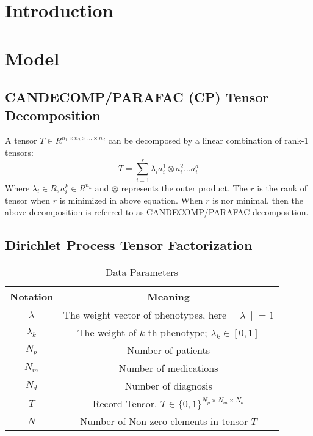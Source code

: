 \documentclass[conference]{IEEEtran}
\begin{document}
\section{Introduction}

\section{Model}

\subsection{CANDECOMP/PARAFAC (CP) Tensor Decomposition}

A tensor $T \in R^{n_1 \times n_2 \times \ldots \times n_d}$ can be decomposed by a linear combination of rank-$1$ tensors:
\[
	T = \sum_{i=1}^r \lambda_i a_i^1 \otimes a_i^2 \ldots a_i^d
\]
Where $\lambda_i \in R, a_i^k \in R^{n_k}$ and $\otimes$ represents the outer product. The $r$ is the rank of tensor when $r$ is minimized in above equation. When $r$ is nor minimal, then the above decomposition is referred to as CANDECOMP/PARAFAC decomposition. 

\subsection{Dirichlet Process Tensor Factorization}

\begin{table}[h]
\caption{Data Parameters}
\label{data_param}
\centering
\begin{tabular}{|c||c|}
\hline
Notation & Meaning\\
\hline
\textbf{$\lambda$} & The weight vector of phenotypes, here $\|\lambda\| = 1$\\
\hline
$\lambda_k$ & The weight of $k$-th phenotype; $\lambda_k \in [0, 1]$ \\
\hline
$N_p$ & Number of patients \\
\hline
$N_m$ & Number of medications \\
\hline
$N_d$ & Number of diagnosis \\
\hline 
$T$ & Record Tensor. $T \in \{0, 1\}^{N_p \times N_m \times N_d}$ \\
$N$ & Number of Non-zero elements in tensor $T$ \\
\hline
\end{tabular}
\end{table}
\end{document}
